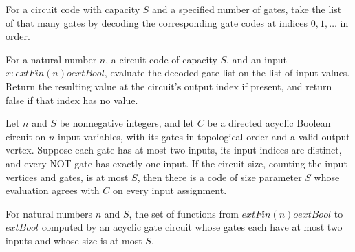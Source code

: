 \begin{definition}
\label{BoolCircuit.gatesOf}
\leanok
{}
For a circuit code with capacity $S$ and a specified number of gates, take the list of
that many gates by decoding the corresponding gate codes at indices $0,1,\ldots$ in
order.
\end{definition}

\begin{definition}
\label{BoolCircuit.evalCode}
\leanok
{}
For a natural number $n$, a circuit code of capacity $S$, and an input
$x:	ext{Fin}(n)	o	ext{Bool}$, evaluate the decoded gate list on the list of input
values. Return the resulting value at the circuit's output index if present, and return
false if that index has no value.
\end{definition}

\begin{theorem}
\label{BoolCircuit.exists_code}
\leanok
{}
Let $n$ and $S$ be nonnegative integers, and let $C$ be a directed acyclic Boolean
circuit on $n$ input variables, with its gates in topological order and a valid output
vertex. Suppose each gate has at most two inputs, its input indices are distinct, and
every NOT gate has exactly one input. If the circuit size, counting the input vertices
and gates, is at most $S$, then there is a code of size parameter $S$ whose evaluation
agrees with $C$ on every input assignment.
\end{theorem}

\begin{definition}
\label{BoolCircuit.computableDAG}
\leanok
{}
For natural numbers $n$ and $S$, the set of functions from $	ext{Fin}(n)	o	ext{Bool}$ to
$	ext{Bool}$ computed by an acyclic gate circuit whose gates each have at most two
inputs and whose size is at most $S$.
\end{definition}

